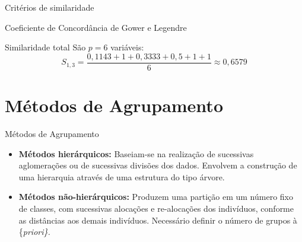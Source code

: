 \documentclass[
  ignorenonframetext,
  aspectratio=169,
]{beamer}
\providecommand{\tightlist}{%
  \setlength{\itemsep}{0pt}\setlength{\parskip}{0pt}}
\begin{document}
\begin{frame}{Critérios de similaridade}
\label{crituxe9rios-de-similaridade-19}
\begin{block}{Coeficiente de Concordância de Gower e Legendre}
\label{coeficiente-de-concorduxe2ncia-de-gower-e-legendre-12}
\begin{block}{Similaridade total}
\label{similaridade-total}
São \(p=6\) variáveis: \[
S_{1,3}
=\dfrac{0,1143+1+0,3333+0,5+1+1}{6}
\approx 0,6579
\]
\end{block}
\end{block}
\end{frame}

\section{Métodos de Agrupamento}\label{muxe9todos-de-agrupamento}

\begin{frame}{Métodos de Agrupamento}
\label{muxe9todos-de-agrupamento-1}
\begin{itemize}
\tightlist
\item
  \textbf{Métodos hierárquicos:} Baseiam-se na realização de sucessivas
  aglomerações ou de sucessivas divisões dos dados. Envolvem a
  construção de uma hierarquia através de uma estrutura do tipo árvore.
\end{itemize}

\pause

\begin{itemize}
\tightlist
\item
  \textbf{Métodos não-hierárquicos:} Produzem uma partição em um número
  fixo de classes, com sucessivas alocações e re-alocações dos
  indivíduos, conforme as distâncias aos demais indivíduos. Necessário
  definir o número de grupos à \{\it priori\}.
\end{itemize}
\end{frame}
\end{document}
